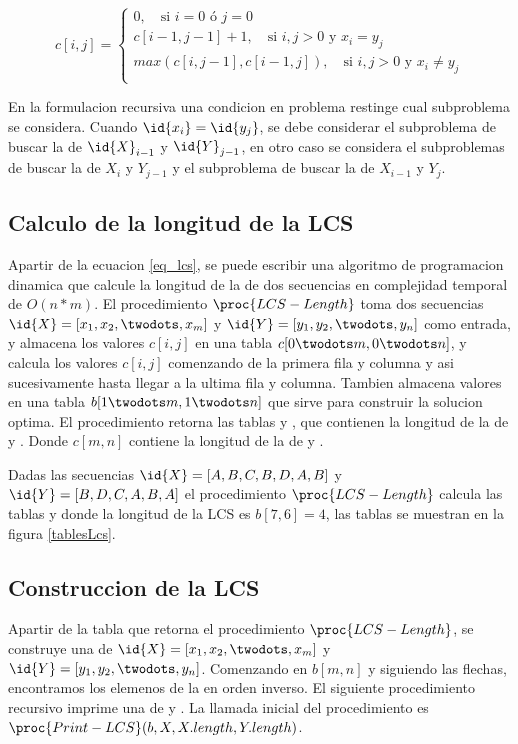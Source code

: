 \begin{equation}
\label{eq_lcs}
c[i,j] =
     \begin{cases}
       0, \quad \text{si } i = 0 \text{ ó } j = 0\\
       c[i-1,j-1]+1, \quad \text{si } i,j > 0 \text{ y } x_i = y_j \\
       max(c[i,j-1],c[i-1,j]), \quad \text{si } i,j > 0 \text{ y } x_i \neq y_j\\
     \end{cases}
\end{equation}

En la formulacion recursiva una condicion en problema restinge cual subproblema se considera. Cuando $\id{x_i} = \id{y_j}$, se debe considerar el subproblema de buscar la  de $\id{X}_{i-1}$ y $\id{Y}_{j-1}$, en otro caso se considera el subproblemas de buscar la  de $X_i$ y $Y_{j-1}$ y el subproblema de buscar la  de $X_{i-1}$ y $Y_j$.

\subsection{Calculo de la longitud de la LCS}
Apartir de la ecuacion \ref{eq_lcs}, se puede escribir una algoritmo de programacion dinamica que calcule la longitud de la  de dos secuencias en complejidad temporal de $O(n * m)$.
El procedimiento $\proc{LCS-Length}$ toma dos secuencias $\id{X} = [x_1,x_2,\twodots,x_m]$ y $\id{Y} = [y_1,y_2,\twodots,y_n]$ como entrada, y almacena los valores $c[i,j]$ en una tabla $c[0 \twodots m, 0 \twodots n]$, y calcula los valores $c[i,j]$ comenzando de la primera fila y columna y asi sucesivamente hasta llegar a la ultima fila y columna. Tambien almacena valores en una tabla $b[1 \twodots m, 1 \twodots n]$ que sirve para construir la solucion optima. El procedimiento retorna las tablas  y , que contienen la longitud de la  de  y . Donde $c[m,n]$ contiene la longitud de la  de  y .



Dadas las secuencias $\id{X} = [A,B,C,B,D,A,B]$ y $\id{Y} = [B,D,C,A,B,A]$ el procedimiento $\proc{LCS-Length}$ calcula las tablas  y  donde la longitud de la LCS es $b[7,6] = 4$, las tablas se muestran en la figura \ref{tablesLcs}.



\subsection{Construccion de la LCS}
Apartir de la tabla  que retorna el procedimiento $\proc{LCS-Length}$, se construye una  de $\id{X}=[x_1,x_2,\twodots,x_m]$ y $\id{Y}=[y_1,y_2,\twodots,y_n]$. Comenzando en $b[m,n]$ y siguiendo las flechas, encontramos los elemenos de la  en orden inverso. El siguiente procedimiento recursivo imprime una  de  y . La llamada inicial del procedimiento es $\proc{Print-LCS}(b, X, X.length, Y.length)$.

